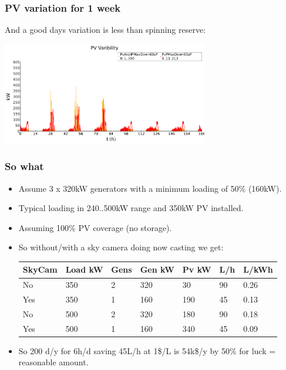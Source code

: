 \documentclass{beamer}
\begin{document}
\begin{frame}\frametitle{PV variation for 1 week}
And a good days variation is less than spinning reserve:

\includegraphics[width=9cm]{figPv2.pdf}  
\end{frame}


\begin{frame}\frametitle{So what}
  \begin{itemize}
  \item Assume 3 x 320kW generators with a minimum loading
    of 50\% (160kW). 
  \item Typical loading in 240..500kW range
    and 350kW PV installed. 
  \item Assuming 100\% PV coverage (no storage).
    \pause
  \item So without/with a sky camera doing now casting we get:
  \begin{center}
    \begin{tabular}[c]{|l|l|l|l|l|l|l|} 
      \hline
      SkyCam & Load kW & Gens & Gen kW & Pv kW & L/h & L/kWh \\
      \hline
      No      & 350     & 2     & 320   & 30    & 90 & 0.26 \\
      Yes     & 350     & 1     & 160   & 190   & 45 & 0.13 \\
      \hline
      No      & 500     & 2     & 320   & 180   & 90 & 0.18 \\
      Yes     & 500     & 1     & 160   & 340   & 45 & 0.09 \\
      \hline
    \end{tabular}
  \end{center}
  \pause
  \item So 200 d/y for 6h/d saving 45L/h at 1\$/L is \pause
    54k\$/y \pause by 50\% for luck = reasonable amount.
  \end{itemize}

\end{frame}
\end{document}
